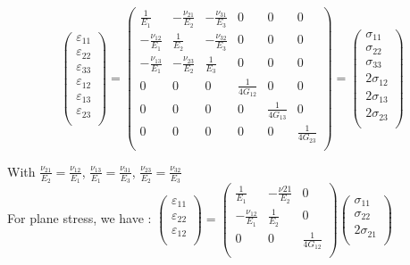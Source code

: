 \documentclass[../main.tex]{subfiles}
\begin{document}
\begin{equation}
    \begin{pmatrix}
        \varepsilon_{11}\\ \varepsilon_{22}\\ \varepsilon_{33}\\ \varepsilon_{12}\\ \varepsilon_{13}\\ \varepsilon_{23}\\ 
    \end{pmatrix} = \begin{pmatrix}
        \frac{1}{E_1} & -\frac{\nu_{21}}{E_2} & -\frac{\nu_{31}}{E_3} & 0 & 0 & 0\\
        -\frac{\nu_{12}}{E_1} & \frac{1}{E_2} & -\frac{\nu_{32}}{E_3} & 0 & 0 & 0\\
        -\frac{\nu_{13}}{E_1} & -\frac{\nu_{23}}{E_2} & \frac{1}{E_3} & 0 & 0 & 0\\
        0 & 0 & 0 & \frac{1}{4G_{12}} & 0 & 0\\
        0 & 0 & 0 & 0 & \frac{1}{4G_{13}} & 0\\
        0 & 0 & 0 & 0 & 0 & \frac{1}{4G_{23}}\\
    \end{pmatrix} = \begin{pmatrix}
        \sigma_{11}\\ \sigma_{22}\\\sigma_{33}\\ 
        2\sigma_{12}\\ 2\sigma_{13}\\ 2\sigma_{23}\\
    \end{pmatrix}
\end{equation}

With $\frac{\nu_{21}}{E_2} = \frac{\nu_{12}}{E_1}$, $\frac{\nu_{13}}{E_1} = \frac{\nu_{31}}{E_3}$, $\frac{\nu_{23}}{E_2} = \frac{\nu_{32}}{E_3}$\\

For plane stress, we have : $\begin{pmatrix}
    \varepsilon_{11}\\ \varepsilon_{22}\\ \varepsilon_{12}\\
\end{pmatrix} = \begin{pmatrix}
    \frac{1}{E_1} & -\frac{\nu{21}}{E_2} & 0\\
    -\frac{\nu_{12}}{E_1} & \frac{1}{E_2} & 0\\
    0 & 0 & \frac{1}{4G_{12}}\\
\end{pmatrix} \begin{pmatrix}
    \sigma_{11} \\ \sigma_{22} \\ 2\sigma_{21}\\
\end{pmatrix}$\\
\end{document}
